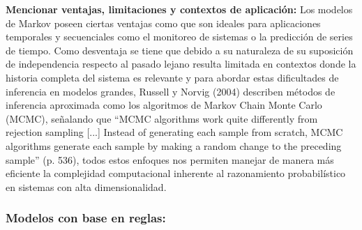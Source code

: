 \documentclass[letterpaper,12pt]{article}
\begin{document}
\begin{itemize}
    \textbf{Mencionar ventajas, limitaciones y contextos de aplicación:}
    Los modelos de Markov poseen ciertas ventajas como que son ideales para aplicaciones temporales y secuenciales como el monitoreo de sistemas o la predicción de series de tiempo.
Como desventaja se tiene que debido a su naturaleza de su suposición de independencia respecto al pasado lejano resulta limitada en contextos donde la historia completa del sistema es relevante y para abordar estas dificultades de inferencia en modelos grandes, Russell y Norvig (2004) describen métodos de inferencia aproximada como los algoritmos de Markov Chain Monte Carlo (MCMC), señalando que “MCMC algorithms work quite differently from rejection sampling [...] Instead of generating each sample from scratch, MCMC algorithms generate each sample by making a random change to the preceding sample” (p. 536), todos estos enfoques nos permiten manejar de manera más eficiente la complejidad computacional inherente al razonamiento probabilístico en sistemas con alta dimensionalidad.
\end{itemize}

\subsubsection{Modelos con base en reglas:}
\end{document}
